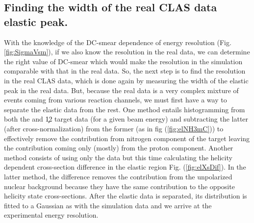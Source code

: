 \subsection{Finding the width of the real CLAS data elastic peak.}
With the knowledge of the DC-smear dependence of energy resolution (Fig. \ref{fig:SigmaVsm}), if we also know the resolution in the real data, 
we can determine the right value of DC-smear which would make the resolution in the simulation comparable with that in the real data. So, 
the next step is to find the resolution in the real CLAS data, which is done again by measuring the width of the elastic peak in the real data. 
But, because the real data is a very complex mixture of events coming from various reaction channels, we must first have a way to separate the elastic 
data from the rest. One method entails histogramming \dE from both the  and \c12 target data (for a given beam energy) and subtracting 
the latter (after cross-normalization) from the former (as in fig (\ref{fig:elNH3mC})) to effectively remove the contribution from nitrogen 
component of the  target leaving the contribution coming only (mostly) 
from the proton component. Another method consists of using only the  data but this time calculating the helicity dependent cross-section 
difference in the elastic region Fig. (\ref{fig:elXsDif}). In the latter method, the difference removes the contribution from the unpolarized 
nuclear background because they have the same contribution to the opposite helicity state cross-sections. After the elastic data is separated, its 
\dE distribution is fitted to a Gaussian as with the simulation data and we arrive at the experimental energy resolution. 



